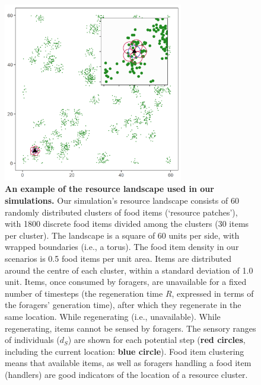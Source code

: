 \begin{figure}
    \centering
    \includegraphics[width=0.7\textwidth]{figures/pathomove/fig_landscape.png}
    \caption{
        \textbf{An example of the resource landscape used in our simulations.} 
        Our simulation's resource landscape consists of 60 randomly distributed clusters of food items (`resource patches'), with 1800 discrete food items divided among the clusters (30 items per cluster). 
        The landscape is a square of 60 units per side, with wrapped boundaries (i.e., a torus). 
        The food item density in our scenarios is 0.5 food items per unit area. 
        Items are distributed around the centre of each cluster, within a standard deviation of 1.0 unit. 
        Items, once consumed by foragers, are unavailable for a fixed number of timesteps (the regeneration time $R$, expressed in terms of the foragers' generation time), after which they regenerate in the same location. 
        While regenerating (i.e., unavailable). While regenerating, items cannot be sensed by foragers. 
        The sensory ranges of individuals (\(d_S\)) are shown for each potential step (\textbf{red circles}, including the current location: \textbf{blue circle}). 
        Food item clustering means that available items, as well as foragers handling a food item (handlers) are good indicators of the location of a resource cluster.
    }\label{fig:patho_landscape}
\end{figure}

